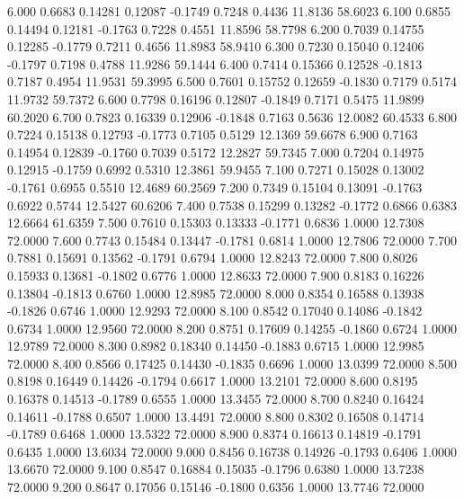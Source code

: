    6.000   0.6683   0.14281   0.12087  -0.1749   0.7248   0.4436  11.8136  58.6023
   6.100   0.6855   0.14494   0.12181  -0.1763   0.7228   0.4551  11.8596  58.7798
   6.200   0.7039   0.14755   0.12285  -0.1779   0.7211   0.4656  11.8983  58.9410
   6.300   0.7230   0.15040   0.12406  -0.1797   0.7198   0.4788  11.9286  59.1444
   6.400   0.7414   0.15366   0.12528  -0.1813   0.7187   0.4954  11.9531  59.3995
   6.500   0.7601   0.15752   0.12659  -0.1830   0.7179   0.5174  11.9732  59.7372
   6.600   0.7798   0.16196   0.12807  -0.1849   0.7171   0.5475  11.9899  60.2020
   6.700   0.7823   0.16339   0.12906  -0.1848   0.7163   0.5636  12.0082  60.4533
   6.800   0.7224   0.15138   0.12793  -0.1773   0.7105   0.5129  12.1369  59.6678
   6.900   0.7163   0.14954   0.12839  -0.1760   0.7039   0.5172  12.2827  59.7345
   7.000   0.7204   0.14975   0.12915  -0.1759   0.6992   0.5310  12.3861  59.9455
   7.100   0.7271   0.15028   0.13002  -0.1761   0.6955   0.5510  12.4689  60.2569
   7.200   0.7349   0.15104   0.13091  -0.1763   0.6922   0.5744  12.5427  60.6206
   7.400   0.7538   0.15299   0.13282  -0.1772   0.6866   0.6383  12.6664  61.6359
   7.500   0.7610   0.15303   0.13333  -0.1771   0.6836   1.0000  12.7308  72.0000
   7.600   0.7743   0.15484   0.13447  -0.1781   0.6814   1.0000  12.7806  72.0000
   7.700   0.7881   0.15691   0.13562  -0.1791   0.6794   1.0000  12.8243  72.0000
   7.800   0.8026   0.15933   0.13681  -0.1802   0.6776   1.0000  12.8633  72.0000
   7.900   0.8183   0.16226   0.13804  -0.1813   0.6760   1.0000  12.8985  72.0000
   8.000   0.8354   0.16588   0.13938  -0.1826   0.6746   1.0000  12.9293  72.0000
   8.100   0.8542   0.17040   0.14086  -0.1842   0.6734   1.0000  12.9560  72.0000
   8.200   0.8751   0.17609   0.14255  -0.1860   0.6724   1.0000  12.9789  72.0000
   8.300   0.8982   0.18340   0.14450  -0.1883   0.6715   1.0000  12.9985  72.0000
   8.400   0.8566   0.17425   0.14430  -0.1835   0.6696   1.0000  13.0399  72.0000
   8.500   0.8198   0.16449   0.14426  -0.1794   0.6617   1.0000  13.2101  72.0000
   8.600   0.8195   0.16378   0.14513  -0.1789   0.6555   1.0000  13.3455  72.0000
   8.700   0.8240   0.16424   0.14611  -0.1788   0.6507   1.0000  13.4491  72.0000
   8.800   0.8302   0.16508   0.14714  -0.1789   0.6468   1.0000  13.5322  72.0000
   8.900   0.8374   0.16613   0.14819  -0.1791   0.6435   1.0000  13.6034  72.0000
   9.000   0.8456   0.16738   0.14926  -0.1793   0.6406   1.0000  13.6670  72.0000
   9.100   0.8547   0.16884   0.15035  -0.1796   0.6380   1.0000  13.7238  72.0000
   9.200   0.8647   0.17056   0.15146  -0.1800   0.6356   1.0000  13.7746  72.0000
